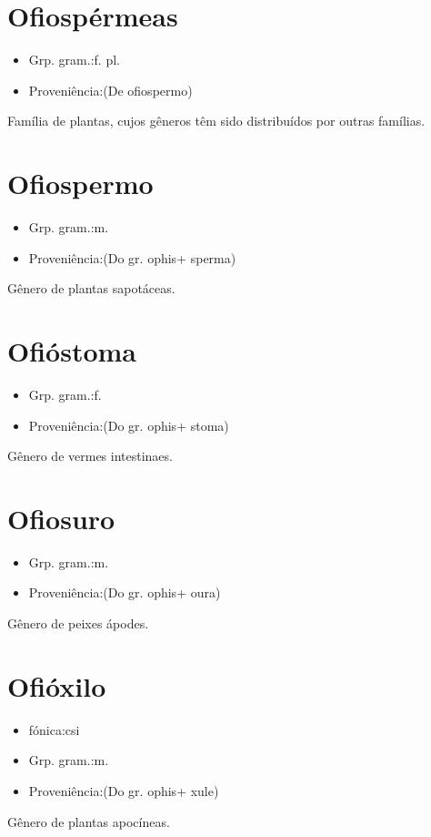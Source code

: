\section{Ofiospérmeas}
\begin{itemize}
\item {Grp. gram.:f. pl.}
\end{itemize}
\begin{itemize}
\item {Proveniência:(De \textunderscore ofiospermo\textunderscore )}
\end{itemize}
Família de plantas, cujos gêneros têm sido distribuídos por outras famílias.
\section{Ofiospermo}
\begin{itemize}
\item {Grp. gram.:m.}
\end{itemize}
\begin{itemize}
\item {Proveniência:(Do gr. \textunderscore ophis\textunderscore  + \textunderscore sperma\textunderscore )}
\end{itemize}
Gênero de plantas sapotáceas.
\section{Ofióstoma}
\begin{itemize}
\item {Grp. gram.:f.}
\end{itemize}
\begin{itemize}
\item {Proveniência:(Do gr. \textunderscore ophis\textunderscore  + \textunderscore stoma\textunderscore )}
\end{itemize}
Gênero de vermes intestinaes.
\section{Ofiosuro}
\begin{itemize}
\item {Grp. gram.:m.}
\end{itemize}
\begin{itemize}
\item {Proveniência:(Do gr. \textunderscore ophis\textunderscore  + \textunderscore oura\textunderscore )}
\end{itemize}
Gênero de peixes ápodes.
\section{Ofióxilo}
\begin{itemize}
\item {fónica:csi}
\end{itemize}
\begin{itemize}
\item {Grp. gram.:m.}
\end{itemize}
\begin{itemize}
\item {Proveniência:(Do gr. \textunderscore ophis\textunderscore  + \textunderscore xule\textunderscore )}
\end{itemize}
Gênero de plantas apocíneas.
